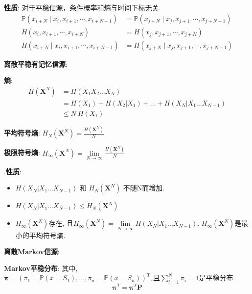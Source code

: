 \documentclass{article}
\newcommand{\env}[2]{\begin{#1}#2\end{#1}}
\begin{document}
                \qquad \textbf{性质}: 
                    对于平稳信源，条件概率和熵与时间下标无关.
                        \env{align*}{
                            \mathbb P\left(x_{i+N} \mid x_{i}, x_{i+1}, \cdots, x_{i+N-1}\right) &= \mathbb P\left(x_{j+N} \mid x_{j}, x_{j+1}, \cdots, x_{j+N-1}\right) \tag{条件概率}\\
                            H\left(x_{i}, x_{i+1}, \cdots, x_{i+N}\right) &= H\left(x_{j}, x_{j+1}, \cdots, x_{j+N}\right) \tag{熵}\\
                            H\left(x_{i+N} \mid x_{i}, x_{i+1}, \cdots, x_{i+N-1}\right) &= H\left(x_{j+N} \mid x_{j}, x_{j+1}, \cdots, x_{j+N-1}\right) \tag{条件熵}
                        }
                        
            \textbf{离散平稳有记忆信源}:
                
                \qquad \textbf{熵}:
                    \env{align*}{
                        H(\boldsymbol X^N) 
                        &= H(X_1 X_2 ... X_N) \tag{定义}\\
                        &= H(X_1) + H(X_2|X_1) + ... + H(X_N | X_1 ... X_{N-1}) \tag{条件熵展开}\\
                        &\le N\ H(X_1) \tag{熵的不增原理}
                    }
                    
                \qquad \textbf{平均符号熵}: $H_N(\boldsymbol X^N) = \frac{H(\boldsymbol X^N)}{N}$
                
                \qquad \textbf{极限符号熵}: $H_\infty(\boldsymbol X^N) = \lim\limits_{N \to \infty} \frac{H(\boldsymbol X^N)}{N}$
                
                    \qquad.\qquad \textbf{性质}: 
                        \env{itemize}{
                        \item $H(X_N | X_1 ... X_{N-1})$ 和 $H_N(\boldsymbol X^N)$ 不随N而增加.
                        \item $H(X_N | X_1 ... X_{N-1}) \le H_N(\boldsymbol X^N)$
                        \item $H_\infty(\boldsymbol X^N)$存在, 且$H_\infty(\boldsymbol X^N) = \lim\limits_{N \to \infty} H(X_N | X_1 ... X_{N-1})$. $H_\infty(\boldsymbol X^N)$是最小的平均符号熵.
                        }
                

        \textbf{离散Markov信源}:
        
            \textbf{Markov平稳分布}: 其中, $\boldsymbol \pi = (\pi_1 = \mathbb P(x = S_1), ..., \pi_n = \mathbb P(x = S_n))^T, \text{且} \sum\limits_{i=1}^N \pi_i = 1$是平稳分布.
                $$\boldsymbol \pi^T = \boldsymbol \pi^T \boldsymbol P$$
                
\end{document}
